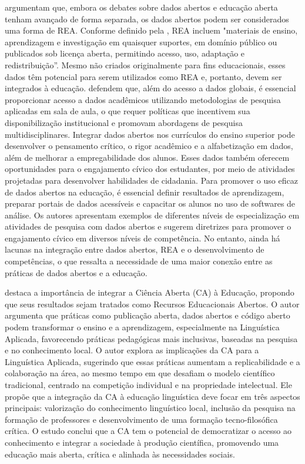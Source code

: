 \documentclass[portuguese]{textolivre}
\begin{document}
\textcite{atenas2015} argumentam que, embora os debates sobre dados abertos e educação aberta tenham avançado de forma separada, os dados abertos podem ser considerados uma forma de REA. Conforme definido pela \textcite[p.~1]{unesco2012}, REA incluem "materiais de ensino, aprendizagem e investigação em quaisquer suportes, em domínio público ou publicados sob licença aberta, permitindo acesso, uso, adaptação e redistribuição”. Mesmo não criados originalmente para fins educacionais, esses dados têm potencial para serem utilizados como REA e, portanto, devem ser integrados à educação. \textcite{atenas2015} defendem que, além do acesso a dados globais, é essencial proporcionar acesso a dados acadêmicos utilizando metodologias de pesquisa aplicadas em sala de aula, o que requer políticas que incentivem sua disponibilização institucional e promovam abordagens de pesquisa multidisciplinares. Integrar dados abertos nos currículos do ensino superior pode desenvolver o pensamento crítico, o rigor acadêmico e a alfabetização em dados, além de melhorar a empregabilidade dos alunos. Esses dados também oferecem oportunidades para o engajamento cívico dos estudantes, por meio de atividades projetadas para desenvolver habilidades de cidadania. Para promover o uso eficaz de dados abertos na educação, é essencial definir resultados de aprendizagem, preparar portais de dados acessíveis e capacitar os alunos no uso de softwares de análise. Os autores apresentam exemplos de diferentes níveis de especialização em atividades de pesquisa com dados abertos e sugerem diretrizes para promover o engajamento cívico em diversos níveis de competência. No entanto, ainda há lacunas na integração entre dados abertos, REA e o desenvolvimento de competências, o que ressalta a necessidade de uma maior conexão entre as práticas de dados abertos e a educação.

\textcite{lima-lopes2022} destaca a importância de integrar a Ciência Aberta (CA) à Educação, propondo que seus resultados sejam tratados como Recursos Educacionais Abertos. O autor argumenta que práticas como publicação aberta, dados abertos e código aberto podem transformar o ensino e a aprendizagem, especialmente na Linguística Aplicada, favorecendo práticas pedagógicas mais inclusivas, baseadas na pesquisa e no conhecimento local. O autor explora as implicações da CA para a Linguística Aplicada, sugerindo que essas práticas aumentam a replicabilidade e a colaboração na área, ao mesmo tempo em que desafiam o modelo científico tradicional, centrado na competição individual e na propriedade intelectual. Ele propõe que a integração da CA à educação linguística deve focar em três aspectos principais: valorização do conhecimento linguístico local, inclusão da pesquisa na formação de professores e desenvolvimento de uma formação tecno-filosófica crítica. O estudo conclui que a CA tem o potencial de democratizar o acesso ao conhecimento e integrar a sociedade à produção científica, promovendo uma educação mais aberta, crítica e alinhada às necessidades sociais.
\end{document}
